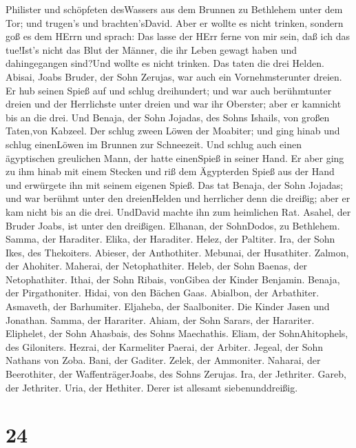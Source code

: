 Philister und schöpfeten desWassers aus dem Brunnen zu Bethlehem unter
dem Tor; und trugen's und brachten'sDavid. Aber er wollte es nicht
trinken, sondern goß es dem HErrn  und sprach: Das lasse
der HErr ferne von mir sein, daß ich das tue!Ist's nicht das Blut der
Männer, die ihr Leben gewagt haben und dahingegangen sind?Und wollte es
nicht trinken. Das taten die drei Helden.  Abisai, Joabs
Bruder, der Sohn Zerujas, war auch ein Vornehmsterunter dreien. Er hub
seinen Spieß auf und schlug dreihundert; und war auch berühmtunter
dreien  und der Herrlichste unter dreien und war ihr
Oberster; aber er kamnicht bis an die drei.  Und Benaja,
der Sohn Jojadas, des Sohns Ishails, von großen Taten,von Kabzeel. Der
schlug zween Löwen der Moabiter; und ging hinab und schlug einenLöwen im
Brunnen zur Schneezeit.  Und schlug auch einen ägyptischen
greulichen Mann, der hatte einenSpieß in seiner Hand. Er aber ging zu
ihm hinab mit einem Stecken und riß dem Ägypterden Spieß aus der Hand
und erwürgete ihn mit seinem eigenen Spieß.  Das tat
Benaja, der Sohn Jojadas; und war berühmt unter den dreienHelden
 und herrlicher denn die dreißig; aber er kam nicht bis an
die drei. UndDavid machte ihn zum heimlichen Rat.  Asahel,
der Bruder Joabs, ist unter den dreißigen. Elhanan, der SohnDodos, zu
Bethlehem.  Samma, der Haraditer. Elika, der Haraditer.
 Helez, der Paltiter. Ira, der Sohn Ikes, des Thekoiters.
 Abieser, der Anthothiter. Mebunai, der Husathiter.
 Zalmon, der Ahohiter. Maherai, der Netophathiter.
 Heleb, der Sohn Baenas, der Netophathiter. Ithai, der Sohn
Ribais, vonGibea der Kinder Benjamin.  Benaja, der
Pirgathoniter. Hidai, von den Bächen Gaas.  Abialbon, der
Arbathiter. Asmaveth, der Barhumiter.  Eljaheba, der
Saalboniter. Die Kinder Jasen und Jonathan.  Samma, der
Harariter. Ahiam, der Sohn Sarars, der Harariter. 
Eliphelet, der Sohn Ahasbais, des Sohns Maechathis. Eliam, der
SohnAhitophels, des Giloniters.  Hezrai, der Karmeliter
Paerai, der Arbiter.  Jegeal, der Sohn Nathans von Zoba.
Bani, der Gaditer.  Zelek, der Ammoniter. Naharai, der
Beerothiter, der WaffenträgerJoabs, des Sohns Zerujas. 
Ira, der Jethriter. Gareb, der Jethriter.  Uria, der
Hethiter. Derer ist allesamt siebenunddreißig.

\hypertarget{section-23}{%
\section{24}\label{section-23}}


